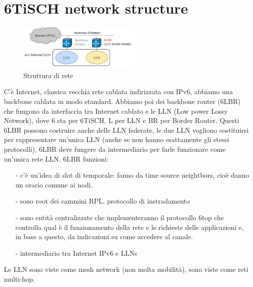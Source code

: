 \documentclass[12pt,italian]{report}
\begin{document}
\section{6TiSCH network structure}
\begin{figure}[h]
\centering
\includegraphics[width=60mm]{img/tschns.PNG}
\caption{Struttura di rete}
\label{fig:oodfffe}
\end{figure}
C'è Internet, classica vecchia rete cablata indirizzata con IPv6, abbiamo una backbone cablata in modo standard. Abbiamo poi dei backbone router (6LBR) che fungono da interfaccia tra Internet cablato e le LLN (Low power Lossy Network), dove 6 sta per 6TiSCH, L per LLN e BR per Border Router. 
\bigbreak
Questi 6LBR possono costruire anche delle LLN federate, le due LLN vogliono costituirsi per rappresentare un'unica LLN (anche se non hanno esattamente gli stessi protocolli), 6LBR deve fungere da intermediario per farle funzionare come un'unica rete LLN. 
\bigbreak
\noindent 6LBR funzioni:
\begin{itemize}
    \item [-] c'è un'idea di slot di temporale: fanno da time source neightbors, cioè danno un orario comune ai nodi. 
    \item [-] sono root dei cammini RPL, protocollo di instradamento
    \item [-] sono entità centralizzate che implementeranno il protocollo 6top che controlla qual è il funzionamento della rete e le richieste delle applicazioni e, in base a questo, da indicazioni su come accedere al canale. 
    \item [-] intermediario tra Internet IPv6 e LLNs
\end{itemize}
Le LLN sono viste come mesh network (non molta mobilità), sono viste come reti multi-hop.
\end{document}
